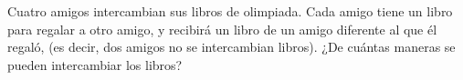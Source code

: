 Cuatro amigos intercambian sus libros de olimpiada. Cada amigo tiene un libro para regalar a otro amigo, y recibirá un libro de un amigo diferente al que él regaló, (es decir, dos amigos no se intercambian libros). ¿De cuántas maneras se pueden intercambiar los libros?